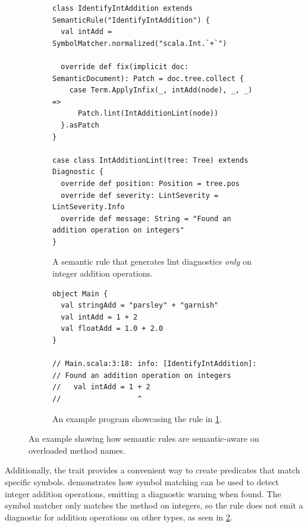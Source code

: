 \documentclass[../../main.tex]{subfiles}
\begin{document}
\begin{figure}[htbp]
\begin{subfigure}{\textwidth}
\begin{verbatim}
class IdentifyIntAddition extends SemanticRule("IdentifyIntAddition") {
  val intAdd = SymbolMatcher.normalized("scala.Int.`+`")

  override def fix(implicit doc: SemanticDocument): Patch = doc.tree.collect {
    case Term.ApplyInfix(_, intAdd(node), _, _) =>
      Patch.lint(IntAdditionLint(node))
  }.asPatch
}

case class IntAdditionLint(tree: Tree) extends Diagnostic {
  override def position: Position = tree.pos
  override def severity: LintSeverity = LintSeverity.Info
  override def message: String = "Found an addition operation on integers"
}
\end{verbatim}
\caption{A semantic rule that generates lint diagnostics \emph{only} on integer addition operations.}
\label{fig:semantic-rule-ex-impl}
\end{subfigure}
%
\begin{subfigure}{\textwidth}
\vspace{3ex} %
\begin{verbatim}
object Main {
  val stringAdd = "parsley" + "garnish"
  val intAdd = 1 + 2
  val floatAdd = 1.0 + 2.0
}

// Main.scala:3:18: info: [IdentifyIntAddition]:
// Found an addition operation on integers
//   val intAdd = 1 + 2
//                  ^
\end{verbatim}
\caption{An example program showcasing the rule in \cref{fig:semantic-rule-ex-impl}.}
\label{fig:semantic-rule-ex-example}
\end{subfigure}
\caption{An example showing how semantic rules are semantic-aware on overloaded method names.}
\label{fig:semantic-rule-ex}
\end{figure}


Additionally, the  trait provides a convenient way to create predicates that match specific symbols.
 demonstrates how symbol matching can be used to detect integer addition operations, emitting a diagnostic warning when found.
The  symbol matcher only matches the \scala{+} method on integers, so the rule does not emit a diagnostic for addition operations on other types, as seen in \cref{fig:semantic-rule-ex-example}.

\end{document}
